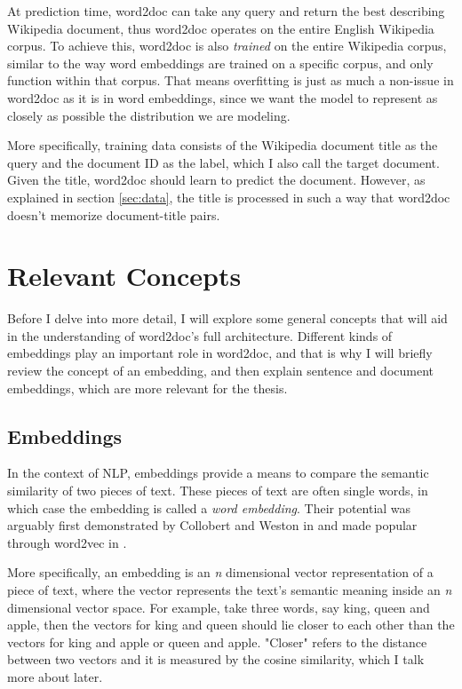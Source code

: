 At prediction time, word2doc can take any query and return the best describing Wikipedia document, thus word2doc
operates on the entire English Wikipedia corpus. To achieve this, word2doc is also \textit{trained} on the entire Wikipedia corpus,
similar to the way word embeddings are trained on a specific corpus, and only function within that corpus. That means overfitting is
just as much a non-issue in word2doc as it is in word embeddings, since we want the model to represent as closely as possible the
distribution we are modeling.

More specifically, training data consists of the Wikipedia document title as the query and the document ID as the label, which I
also call the target document. Given the title, word2doc should learn to predict the document. However, as explained in section
\ref{sec:data}, the title is processed in such a way that word2doc doesn't memorize document-title pairs.


\section{Relevant Concepts}

Before I delve into more detail, I will explore some general concepts that will aid in the understanding of word2doc's full architecture.
Different kinds of embeddings play an important role in word2doc, and that is why I will briefly review the concept of an embedding,
and then explain sentence and document embeddings, which are more relevant for the thesis.


\subsection{Embeddings}
\label{theory:embb}

In the context of NLP, embeddings provide a means to compare the semantic similarity of two pieces of text. These pieces of text are
often single words, in which case the embedding is called a \textit{word embedding}. Their potential was arguably first demonstrated
by Collobert and Weston in \citet{coll-word-embb} and made popular through word2vec in \citet{word2vec}.

More specifically, an embedding is an \textit{n} dimensional vector representation of a piece of text, where the vector represents
the text's semantic meaning inside an \textit{n} dimensional vector space. For example, take three words, say king, queen and
apple, then the vectors for king and queen should lie closer to each other than the vectors for king and apple or queen and apple.
"Closer" refers to the distance between two vectors and it is measured by the cosine similarity, which I talk more about later.


